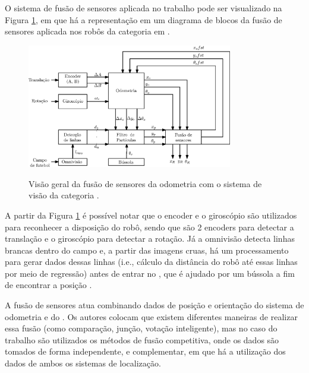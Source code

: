 \documentclass[acronym, symbols, table]{fei}
\begin{document}
O sistema de fusão de sensores aplicada no trabalho pode ser visualizado na Figura \ref{fig:msl_sensor_fusion}, em que há a representação em um diagrama de blocos da fusão de sensores aplicada nos robôs da categoria  em \textcite{ismail2022soccer}.

\begin{figure}[!htb]
	\centering
	\caption{Visão geral da fusão de sensores da odometria com o sistema de visão da categoria .} 
	\includegraphics[width=0.8\textwidth]{msl_sensor_fusion.eps}
	\label{fig:msl_sensor_fusion}
\end{figure}

A partir da Figura \ref{fig:msl_sensor_fusion} é possível notar que o encoder e o giroscópio são utilizados para reconhecer a disposição do robô, sendo que são 2 encoders para detectar a translação e o giroscópio para detectar a rotação. Já a omnivisão detecta linhas brancas dentro do campo e, a partir das imagens cruas, há um processamento para gerar dados dessas linhas (i.e., cálculo da distância do robô até essas linhas por meio de regressão) antes de entrar no , que é ajudado por um bússola a fim de encontrar a posição .


A fusão de sensores atua combinando dados de posição e orientação do sistema de odometria e do . Os autores colocam que existem diferentes maneiras de realizar essa fusão (como comparação, junção, votação inteligente), mas no caso do trabalho são utilizados os métodos de fusão competitiva, onde os dados são tomados de forma independente, e complementar, em que há a utilização dos dados de ambos os sistemas de localização.
\end{document}
